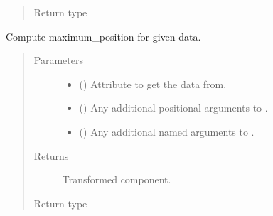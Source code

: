 \documentclass[letterpaper,10pt,english]{sphinxmanual}
\begin{document}
\begin{fulllineitems}
\begin{fulllineitems}
\begin{quote}
\begin{description}
\item[{Return type}] \leavevmode
{\hyperref[\detokenize{api/base_classes:geology.src.base_spatial.SpatialComponent}]{}}

\end{description}\end{quote}

\end{fulllineitems}


\begin{fulllineitems}
\label{\detokenize{api/states:geology.src.States.maximum_position}}
Compute maximum\_position for given data.
\begin{quote}\begin{description}
\item[{Parameters}] \leavevmode\begin{itemize}
\item {} 
 (\sphinxstyleliteralemphasis{\sphinxupquote{, }}) \textendash{} Attribute to get the data from.

\item {} 
 () \textendash{} Any additional positional arguments to .

\item {} 
 () \textendash{} Any additional named arguments to .

\end{itemize}

\item[{Returns}] \leavevmode
{} \textendash{} Transformed component.

\item[{Return type}] \leavevmode
{\hyperref[\detokenize{api/base_classes:geology.src.base_spatial.SpatialComponent}]{}}


\end{description}
\end{quote}
\end{fulllineitems}
\end{fulllineitems}
\end{document}

